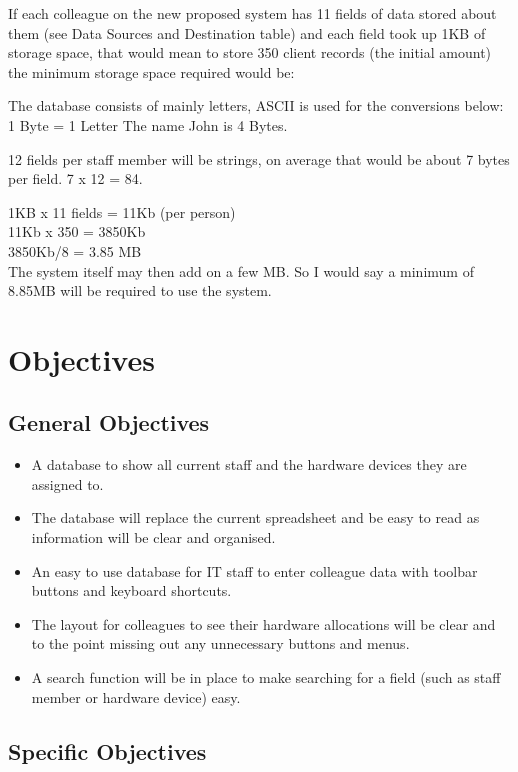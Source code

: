 If each colleague on the new proposed system has 11 fields of data stored about them (see Data Sources and Destination table) and each field took up 1KB of storage space, that would mean to store 350 client records (the initial amount) the minimum storage space required would be:

The database consists of mainly letters, ASCII is used for the conversions below:
1 Byte = 1 Letter
The name John is 4 Bytes.

12 fields per staff member will be strings, on average that would be about 7 bytes per field. 7 x 12 = 84.

1KB x 11 fields = 11Kb (per person)\\
11Kb x 350 = 3850Kb\\
3850Kb/8 = 3.85 MB\\

The system itself may then add on a few MB. So I would say a minimum of 8.85MB will be required to use the system.


\section{Objectives}

\subsection{General Objectives}

\begin{itemize}
\item A database to show all current staff and the hardware devices they are assigned to.
\item The database will replace the current spreadsheet and be easy to read as information will be clear and organised.
\item An easy to use database for IT staff to enter colleague data with toolbar buttons and keyboard shortcuts.
\item The layout for colleagues to see their hardware allocations will be clear and to the point missing out any unnecessary buttons and menus.
\item A search function will be in place to make searching for a field (such as staff member or hardware device) easy.
\end{itemize}

\subsection{Specific Objectives}

